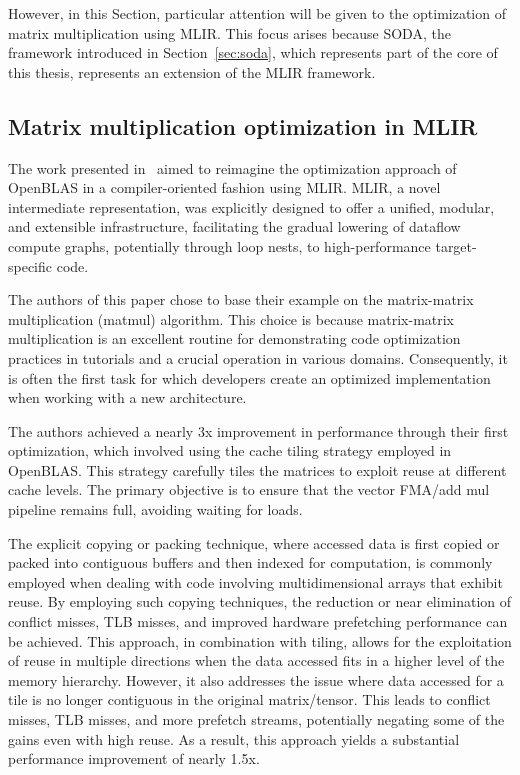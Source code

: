 However, in this Section, particular attention will be given to the optimization of matrix multiplication using MLIR.
This focus arises because SODA, the framework introduced in Section~\ref{sec:soda}, which represents part of the core of this thesis, represents an extension of the MLIR framework.

\subsection{Matrix multiplication optimization in MLIR}
\label{subsec:matmul-opt-mlir}%

The work presented in~\cite{DBLP:journals/corr/abs-2003-00532} aimed to reimagine the optimization approach of OpenBLAS in a compiler-oriented fashion using MLIR.
MLIR, a novel intermediate representation, was explicitly designed to offer a unified, modular, and extensible infrastructure, facilitating the gradual lowering of dataflow compute graphs, potentially through loop nests, to high-performance target-specific code.

The authors of this paper chose to base their example on the matrix-matrix multiplication (matmul) algorithm.
This choice is because matrix-matrix multiplication is an excellent routine for demonstrating code optimization practices in tutorials and a crucial operation in various domains.
Consequently, it is often the first task for which developers create an optimized implementation when working with a new architecture.

The authors achieved a nearly 3x improvement in performance through their first optimization, which involved using the cache tiling strategy employed in OpenBLAS.
This strategy carefully tiles the matrices to exploit reuse at different cache levels.
The primary objective is to ensure that the vector FMA/add mul pipeline remains full, avoiding waiting for loads.

The explicit copying or packing technique, where accessed data is first copied or packed into contiguous buffers and then indexed for computation, is commonly employed when dealing with code involving multidimensional arrays that exhibit reuse.
By employing such copying techniques, the reduction or near elimination of conflict misses, TLB misses, and improved hardware prefetching performance can be achieved.
This approach, in combination with tiling, allows for the exploitation of reuse in multiple directions when the data accessed fits in a higher level of the memory hierarchy.
However, it also addresses the issue where data accessed for a tile is no longer contiguous in the original matrix/tensor.
This leads to conflict misses, TLB misses, and more prefetch streams, potentially negating some of the gains even with high reuse.
As a result, this approach yields a substantial performance improvement of nearly 1.5x.

